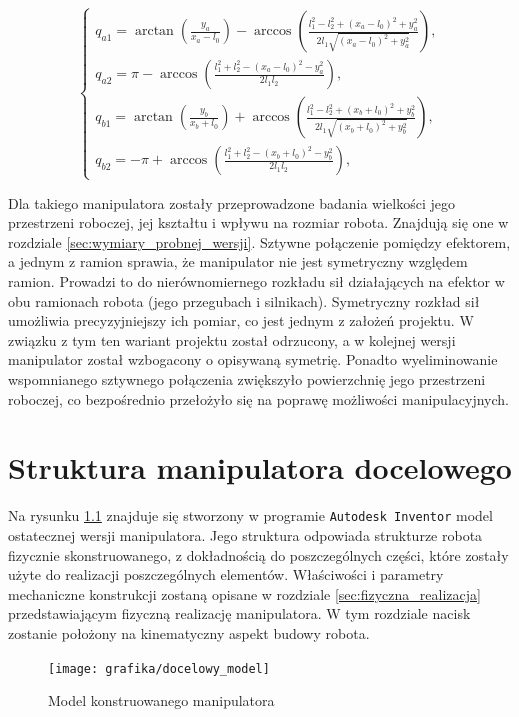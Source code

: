\documentclass[printmode]{mgr}
\begin{document}
\begin{equation}
\begin{cases}
q_{a1} = \arctan(\frac{y_a}{x_a-l_0})-\arccos(\frac{l_1^2-l_2^2+(x_a-l_0)^2+y_a^2}{2l_1\sqrt{(x_a-l_0)^2+y_a^2}}),\\
q_{a2} = \pi - \arccos(\frac{l_1^2+l_2^2-(x_a-l_0)^2-y_a^2}{2l_1l_2}),\\
q_{b1} = \arctan(\frac{y_b}{x_b+l_0}) + \arccos(\frac{l_1^2-l_2^2+(x_b+l_0)^2+y_b^2}{2l_1\sqrt{(x_b+l_0)^2+y_b^2}}),\\
q_{b2} = -\pi + \arccos(\frac{l_1^2+l_2^2-(x_b+l_0)^2-y_b^2}{2l_1l_2}),
\end{cases}
\label{eq:testowa_kinematyka_odwrotna}
\end{equation}

Dla takiego manipulatora zostały przeprowadzone badania wielkości jego przestrzeni roboczej, jej kształtu i wpływu na rozmiar robota.
Znajdują się one w rozdziale \ref{sec:wymiary_probnej_wersji}. 
Sztywne połączenie pomiędzy efektorem, a jednym z ramion sprawia, że manipulator nie jest symetryczny względem ramion. 
Prowadzi to do nierównomiernego rozkładu sił działających na efektor w obu ramionach robota (jego przegubach i silnikach).
Symetryczny rozkład sił umożliwia precyzyjniejszy ich pomiar, co jest jednym z założeń projektu. 
W związku z tym ten wariant projektu został odrzucony, a w kolejnej wersji manipulator został wzbogacony o opisywaną symetrię. 
Ponadto wyeliminowanie wspomnianego sztywnego połączenia zwiększyło powierzchnię jego przestrzeni roboczej, co bezpośrednio przełożyło
się na poprawę możliwości manipulacyjnych.


\chapter{Struktura manipulatora docelowego}\label{sec:struktura_manipulatora_docelowego}
Na rysunku \ref{rys:docelowy_model} znajduje się stworzony w programie \texttt{Autodesk Inventor} model
ostatecznej wersji manipulatora. Jego struktura odpowiada strukturze robota fizycznie skonstruowanego, z dokładnością
do poszczególnych części, które zostały użyte do realizacji poszczególnych elementów. Właściwości i parametry mechaniczne
konstrukcji zostaną opisane w rozdziale \ref{sec:fizyczna_realizacja} przedstawiającym fizyczną realizację manipulatora.
W tym rozdziale nacisk zostanie położony na kinematyczny aspekt budowy robota.
\begin{figure}[tp]
\centering
  \texttt{[image: grafika/docelowy\_model]}
  \caption{Model konstruowanego manipulatora}
  \label{rys:docelowy_model}  
\end{figure}
\end{document}
